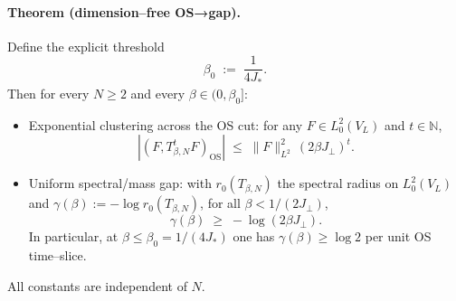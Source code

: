 \documentclass[11pt]{amsart}
\begin{document}
\paragraph{Theorem (dimension–free OS→gap).}
Define the explicit threshold
\[
  \beta_0\;:=\;\frac{1}{4 J_{\!*}}.
\]
Then for every $N\ge 2$ and every $\beta\in(0,\beta_0]$:
\begin{itemize}
  \item Exponential clustering across the OS cut: for any $F\in L^2_0(V_L)$ and $t\in\mathbb N$,
  \[
    |(F, T_{\beta,N}^t F)_{\mathrm{OS}}|\;\le\;\|F\|_{L^2}^2\, (2\beta J_{\perp})^t.
  \]
  \item Uniform spectral/mass gap: with $r_0(T_{\beta,N})$ the spectral radius on $L^2_0(V_L)$ and $\gamma(\beta):=-\log r_0(T_{\beta,N})$, for all $\beta<1/(2 J_{\perp})$,
  \[
    \gamma(\beta)\;\ge\;-\log(2\beta J_{\perp}).
  \]
  In particular, at $\beta\le\beta_0=1/(4J_{\!*})$ one has $\gamma(\beta)\ge \log 2$ per unit OS time–slice.
\end{itemize}
All constants are independent of $N$.
\end{document}
